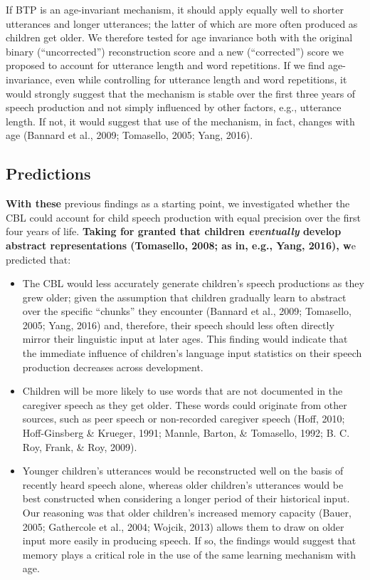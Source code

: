 \documentclass[man,mask,floatsintext]{apa6}
\providecommand{\tightlist}{%
  \setlength{\itemsep}{0pt}\setlength{\parskip}{0pt}}
\begin{document}
If BTP is an age-invariant mechanism, it should apply equally well to
shorter utterances and longer utterances; the latter of which are more
often produced as children get older. We therefore tested for age
invariance both with the original binary (\enquote{uncorrected})
reconstruction score and a new (\enquote{corrected}) score we proposed
to account for utterance length and word repetitions. If we find
age-invariance, even while controlling for utterance length and word
repetitions, it would strongly suggest that the mechanism is stable over
the first three years of speech production and not simply influenced by
other factors, e.g., utterance length. If not, it would suggest that use
of the mechanism, in fact, changes with age (Bannard et al., 2009;
Tomasello, 2005; Yang, 2016).

\subsection{Predictions}\label{predictions}

\textbf{With these} previous findings as a starting point, we
investigated whether the CBL could account for child speech production
with equal precision over the first four years of life. \textbf{Taking
for granted that children \emph{eventually} develop abstract
representations (Tomasello, 2008; as in, e.g., Yang, 2016), w}e
predicted that:

\begin{itemize}
\tightlist
\item
  The CBL would less accurately generate children's speech productions
  as they grew older; given the assumption that children gradually learn
  to abstract over the specific \enquote{chunks} they encounter (Bannard
  et al., 2009; Tomasello, 2005; Yang, 2016) and, therefore, their
  speech should less often directly mirror their linguistic input at
  later ages. This finding would indicate that the immediate influence
  of children's language input statistics on their speech production
  decreases across development.
\item
  Children will be more likely to use words that are not documented in
  the caregiver speech as they get older. These words could originate
  from other sources, such as peer speech or non-recorded caregiver
  speech (Hoff, 2010; Hoff-Ginsberg \& Krueger, 1991; Mannle, Barton, \&
  Tomasello, 1992; B. C. Roy, Frank, \& Roy, 2009).
\item
  Younger children's utterances would be reconstructed well on the basis
  of recently heard speech alone, whereas older children's utterances
  would be best constructed when considering a longer period of their
  historical input. Our reasoning was that older children's increased
  memory capacity (Bauer, 2005; Gathercole et al., 2004; Wojcik, 2013)
  allows them to draw on older input more easily in producing speech. If
  so, the findings would suggest that memory plays a critical role in
  the use of the same learning mechanism with age.
\end{itemize}
\end{document}
